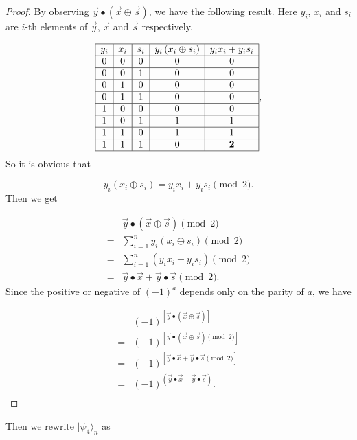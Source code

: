 \begin{proof}
By observing $\vec{y} \bullet(\vec{x} \oplus \vec{s})$, we have the following result. Here $y_i$, $x_i$ and $s_i$ are $i$-th elements of $\vec{y}$, $\vec{x}$ and $\vec{s}$ respectively.

$$
\begin{array}{|c|c|c|c|c|}
\hline y_i & x_i & s_i & y_i\left(x_i \oplus s_i\right) & y_i x_i+y_i s_i\\
\hline 0 & 0 & 0 & 0 & 0 \\
\hline 0 & 0 & 1 & 0 & 0 \\
\hline 0 & 1 & 0 & 0 & 0 \\
\hline 0 & 1 & 1 & 0 & 0 \\
\hline 1 & 0 & 0 & 0 & 0 \\
\hline 1 & 0 & 1 & 1 & 1 \\
\hline 1 & 1 & 0 & 1 & 1 \\
\hline 1 & 1 & 1 & 0 & \textbf{2} \\
\hline
\end{array},
$$
So it is obvious that

$$
y_i\left(x_i \oplus s_i\right) = y_ix_i + y_is_i \pmod{2}.
$$
Then we get

$$
\begin{aligned}
&  \vec{y} \bullet (\vec{x} \oplus \vec{s}) \pmod{2}\\
= & \sum_{i=1}^n y_i \left(x_i \oplus s_i\right) \pmod{2} \\
= & \sum_{i=1}^n\left(y_i x_i+y_i s_i\right) \pmod{2} \\
= & \vec{y} \bullet \vec{x}+\vec{y} \bullet \vec{s} \pmod{2}.
\end{aligned}
$$
Since the positive or negative of $(-1)^a$ depends only on the parity of $a$, we have

$$
\begin{aligned}
& (-1)^{[\vec{y} \bullet (\vec{x} \oplus \vec{s})]} \\
= & (-1)^{[\vec{y} \bullet (\vec{x} \oplus \vec{s}) \pmod{2}]} \\
= & (-1)^{[\vec{y} \bullet \vec{x}+\vec{y} \bullet \vec{s} \pmod{2}]} \\
= & (-1)^{(\vec{y} \bullet \vec{x}+\vec{y} \bullet \vec{s})}. \\
\end{aligned}
$$
\end{proof}
Then we rewrite $|\psi_4\rangle_n$ as

